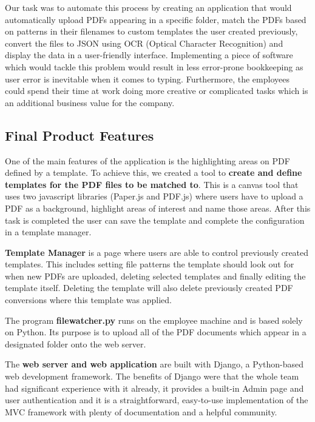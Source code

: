 \documentclass{l3proj}
\begin{document}
Our task was to automate this process by creating an application that would automatically upload PDFs appearing in a specific folder, match the PDFs based on patterns in their filenames to custom templates the user created previously, convert the files to JSON using OCR (Optical Character Recognition) and display the data in a user-friendly interface.
Implementing a piece of software which would tackle this problem would result in less error-prone bookkeeping as user error is inevitable when it comes to typing. Furthermore, the employees could spend their time at work doing more creative or complicated tasks which is an additional business value for the company.
\subsection{Final Product Features}

One of the main features of the application is the highlighting areas on PDF defined by a template. To achieve this, we created a tool to \textbf{create and define templates for the PDF files to be matched to}. This is a canvas tool that uses two javascript libraries (Paper.js and PDF.js) where users have to upload a PDF as a background, highlight areas of interest and name those areas. After this task is completed the user can save the template and complete the configuration in a template manager.

\textbf{Template Manager} is a page where users are able to control previously created templates. This includes setting file patterns the template should look out for when new PDFs are uploaded, deleting selected templates and finally editing the template itself. Deleting the template will also delete previously created PDF conversions where this template was applied.

The program \textbf{filewatcher.py} runs on the employee machine and is based solely on Python. Its purpose is to upload all of the PDF documents which appear in a designated folder onto the web server.

The \textbf{web server and web application} are built with Django, a Python-based web development framework. The benefits of Django were that the whole team had significant experience with it already, it provides a built-in Admin page and user authentication and it is a straightforward, easy-to-use implementation of the MVC framework with plenty of documentation and a helpful community.
\end{document}
